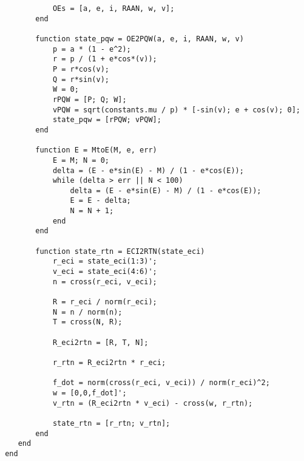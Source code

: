 \begin{lstlisting}
            OEs = [a, e, i, RAAN, w, v];
        end

        function state_pqw = OE2PQW(a, e, i, RAAN, w, v)
            p = a * (1 - e^2);
            r = p / (1 + e*cos*(v));
            P = r*cos(v);
            Q = r*sin(v);
            W = 0;
            rPQW = [P; Q; W];
            vPQW = sqrt(constants.mu / p) * [-sin(v); e + cos(v); 0];
            state_pqw = [rPQW; vPQW];
        end

        function E = MtoE(M, e, err)
            E = M; N = 0;
            delta = (E - e*sin(E) - M) / (1 - e*cos(E));
            while (delta > err || N < 100)
                delta = (E - e*sin(E) - M) / (1 - e*cos(E));
                E = E - delta;
                N = N + 1;
            end
        end

        function state_rtn = ECI2RTN(state_eci)
            r_eci = state_eci(1:3)';
            v_eci = state_eci(4:6)';
            n = cross(r_eci, v_eci);

            R = r_eci / norm(r_eci);
            N = n / norm(n);
            T = cross(N, R);

            R_eci2rtn = [R, T, N];

            r_rtn = R_eci2rtn * r_eci;

            f_dot = norm(cross(r_eci, v_eci)) / norm(r_eci)^2;
            w = [0,0,f_dot]';
            v_rtn = (R_eci2rtn * v_eci) - cross(w, r_rtn);

            state_rtn = [r_rtn; v_rtn];
        end
    end
 end
\end{lstlisting}